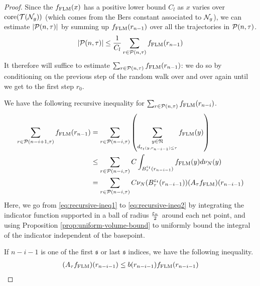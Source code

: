 \begin{proof}
  Since the $f_{\mathrm{FLM}}(x)$ has a positive lower bound $C_l$ as $x$ varies over $\mathrm{core}(\mathcal{T}(\mathcal{N}_g))$ (which comes from the Bers constant associated to $\mathcal{N}_g$), we can estimate $\left| \mathcal{P}(n, \tau) \right|$ by summing up $f_{\mathrm{FLM}}(r_{n-1})$ over all the trajectories in $\mathcal{P}(n, \tau)$.
  \begin{align*}
   \left| \mathcal{P}(n, \tau) \right| \leq \frac{1}{C_l} \sum_{r \in \mathcal{P}(n, \tau)} f_{\mathrm{FLM}}(r_{n-1})
  \end{align*}
  It therefore will suffice to estimate $\sum_{r \in \mathcal{P}(n, \tau)} f_{\mathrm{FLM}}(r_{n-1})$: we do so by conditioning on the previous step of the random walk over and over again until we get to the first step $r_0$.

  We have the following recursive inequality for $\sum_{r \in \mathcal{P}(n, \tau)} f_{\mathrm{FLM}}(r_{n-i})$.
  \begin{align}
    \sum_{r \in \mathcal{P}(n-i+1, \tau)} f_{\mathrm{FLM}}(r_{n-1}) &= \sum_{r \in \mathcal{P}(n-i, \tau)} \left( \sum_{\substack{y \in \mathfrak{N} \\  d_{\varepsilon_t(y, r_{n-i-1}) \leq \tau} } } f_{\mathrm{FLM}}(y) \right) \label{eq:recursive-ineq1} \\
                                              &\leq \sum_{r \in \mathcal{P}(n-i, \tau)} C \int_{B_{\tau}^{\varepsilon_t}(r_{n-i-1})} f_{\mathrm{FLM}}(y) d\nu_N(y) \label{eq:recursive-ineq2} \\
    &= \sum_{r \in \mathcal{P}(n-i, \tau)} C \nu_N(B_{\tau}^{\varepsilon_t}(r_{n-i-1})) (A_{\tau}f_{\mathrm{FLM}})(r_{n-i-1})
  \end{align}
  Here, we go from \eqref{eq:recursive-ineq1} to \eqref{eq:recursive-ineq2} by integrating the indicator function supported in a ball of radius $\frac{\varepsilon_n}{2}$ around each net point, and using Proposition \ref{prop:uniform-volume-bound} to uniformly bound the integral of the indicator independent of the basepoint.

  If $n-i-1$ is one of the first $\mathfrak{s}$ or last $\mathfrak{s}$ indices, we have the following inequality.
  \begin{align}
    \label{eq:flm-bad}
    (A_{\tau}f_{\mathrm{FLM}})(r_{n-i-1}) \leq b(r_{n-i-1}) f_{\mathrm{FLM}}(r_{n-i-1})
  \end{align}


\end{proof}
